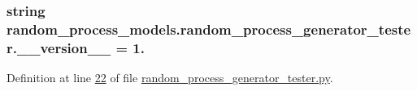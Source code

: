\subsubsection[{\+\_\+\+\_\+version\+\_\+\+\_\+}]{\setlength{\rightskip}{0pt plus 5cm}string random\+\_\+process\+\_\+models.\+random\+\_\+process\+\_\+generator\+\_\+tester.\+\_\+\+\_\+version\+\_\+\+\_\+ = \textquotesingle{}1.\textquotesingle{}}\label{namespacerandom__process__models_1_1random__process__generator__tester_a6d64c35578abb54108b6261a9a668bbe}


Definition at line \hyperlink{random__process__generator__tester_8py_source_l00022}{22} of file \hyperlink{random__process__generator__tester_8py_source}{random\+\_\+process\+\_\+generator\+\_\+tester.\+py}.


